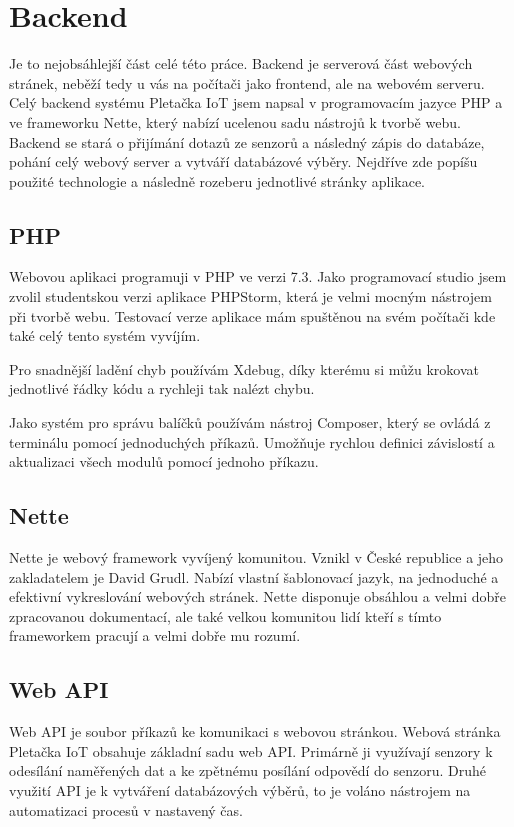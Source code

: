 \section{Backend}
Je to nejobsáhlejší část celé této práce. 
Backend je serverová část webových stránek, neběží tedy u vás na počítači jako frontend, ale na webovém serveru.   
Celý backend systému Pletačka IoT jsem napsal v programovacím jazyce PHP a ve frameworku Nette\cite{NETTE}, který nabízí ucelenou sadu nástrojů k tvorbě webu.
Backend se stará o přijímání dotazů ze senzorů a následný zápis do databáze, pohání celý webový server a vytváří databázové výběry.
Nejdříve zde popíšu použité technologie a následně rozeberu jednotlivé stránky aplikace.

\subsection{PHP}
Webovou aplikaci programuji v PHP ve verzi 7.3. Jako programovací studio jsem zvolil studentskou verzi aplikace PHPStorm, která je velmi mocným nástrojem při tvorbě webu.
Testovací verze aplikace mám spuštěnou na svém počítači kde také celý tento systém vyvíjím. 

Pro snadnější ladění chyb používám Xdebug, díky kterému si můžu krokovat jednotlivé řádky kódu a rychleji tak nalézt chybu.

Jako systém pro správu balíčků používám nástroj Composer, který se ovládá z terminálu pomocí jednoduchých příkazů.
Umožňuje rychlou definici závislostí a aktualizaci všech modulů pomocí jednoho příkazu.


\subsection{Nette}
Nette je webový framework vyvíjený komunitou. Vznikl v České republice a jeho zakladatelem je David Grudl. 
Nabízí vlastní šablonovací jazyk, na jednoduché a efektivní vykreslování webových stránek. 
Nette disponuje obsáhlou a velmi dobře zpracovanou dokumentací, ale také velkou komunitou lidí kteří s tímto frameworkem pracují a velmi dobře mu rozumí. 


\subsection{Web API}

\fxnote[author=JPA]{\textcolor{mygreen}{Chtěl bych se ještě pobavit o definici/popisu Web API}}

Web API je soubor příkazů ke komunikaci s webovou stránkou.
Webová stránka Pletačka IoT obsahuje základní sadu web API.
Primárně ji využívají senzory k odesílání naměřených dat a ke zpětnému posílání odpovědí do senzoru.
Druhé využití API je k vytváření databázových výběrů, to je voláno nástrojem na automatizaci procesů v nastavený čas. 



